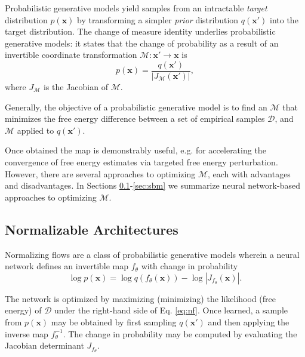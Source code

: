\documentclass[%
 aip,
 amsmath,amssymb,
 reprint,%
]{revtex4-1}
\begin{document}
Probabilistic generative models yield samples from an intractable {\it target} distribution $p(\mathbf{x})$ by transforming a simpler {\it prior} distribution $q(\mathbf{x}')$ into the target distribution. The change of measure identity underlies probabilistic generative models: it states that the change of probability as a result of an invertible coordinate transformation $\mathcal{M}: \mathbf{x}' \rightarrow \mathbf{x}$ is
\begin{equation}
    \label{eq:change-of-measure}
    p(\mathbf{x}) = \frac{q(\mathbf{x}')}{|J_\mathcal{M}(\mathbf{x}')|},
\end{equation}
where $J_\mathcal{M}$ is the Jacobian of $\mathcal{M}$. 

Generally, the objective of a probabilistic generative model is to find an $\mathcal{M}$ that minimizes the free energy difference between a set of empirical samples $\mathcal{D}$, and $\mathcal{M}$ applied to $q(\mathbf{x}')$. 

Once obtained the map is demonstrably useful, e.g. for accelerating the convergence of free energy estimates via targeted free energy perturbation\cite{tfep-2002,bijective-maps-2009,BoltzmannGenerators,tfep-2020,tfep-2021,lrex-2022,thermomaps-2023}. However, there are several approaches to optimizing $\mathcal{M}$, each with advantages and disadvantages. In Sections \ref{sec:normalizing-flows}-\ref{sec:sbm} we summarize neural network-based approaches to optimizing $\mathcal{M}$.

\subsection{Normalizable Architectures}
\label{sec:normalizing-flows}

Normalizing flows \cite{kobyzev2020normalizing, papamakarios2021normalizing} are a class of probabilistic generative models wherein a neural network defines an invertible map $f_\theta$ with change in probability
\begin{equation} 
\label{eq:nf} 
\log p(\mathbf{x}) = \log q(f_\theta(\mathbf{x})) - \log \left|  J_{f_\theta}(\mathbf{x}) \right|.
\end{equation} 

The network is optimized by maximizing (minimizing) the likelihood (free energy) of $\mathcal{D}$ under the right-hand side of Eq. \ref{eq:nf}. Once learned, a sample from $p(\mathbf{x})$ may be obtained by first sampling $q(\mathbf{x}')$ and then applying the inverse map $f_\theta^{-1}$. The change in probability may be computed by evaluating the Jacobian determinant $J_{f_\theta}$. 
\end{document}
